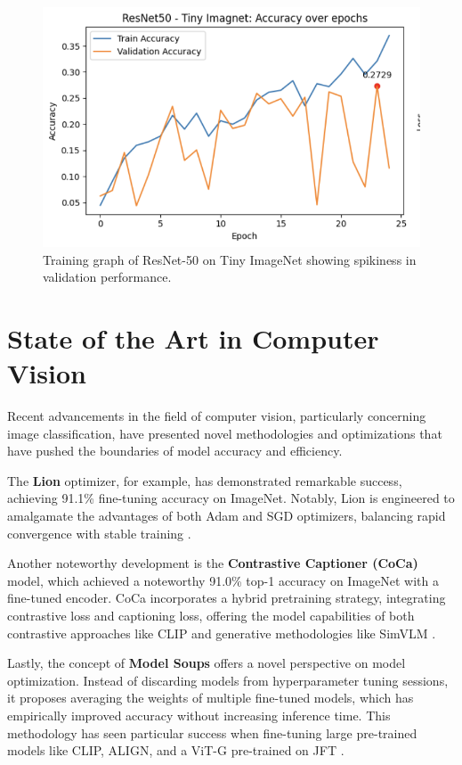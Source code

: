 \documentclass[letterpaper]{article}
\begin{document}
\begin{figure}
    \centering
    \includegraphics[width=0.8\linewidth]{resnet50_tiny_imagenet_training_graph.png}
    \caption{Training graph of ResNet-50 on Tiny ImageNet showing spikiness in validation performance.}
    \label{fig:spikygraph}
\end{figure}

\section{State of the Art in Computer Vision}

Recent advancements in the field of computer vision, particularly concerning image classification, have presented novel methodologies and optimizations that have pushed the boundaries of model accuracy and efficiency. 

The \textbf{Lion} optimizer, for example, has demonstrated remarkable success, achieving 91.1\% fine-tuning accuracy on ImageNet. Notably, Lion is engineered to amalgamate the advantages of both Adam and SGD optimizers, balancing rapid convergence with stable training \cite{chen2023symbolic}.

Another noteworthy development is the \textbf{Contrastive Captioner (CoCa)} model, which achieved a noteworthy 91.0\% top-1 accuracy on ImageNet with a fine-tuned encoder. CoCa incorporates a hybrid pretraining strategy, integrating contrastive loss and captioning loss, offering the model capabilities of both contrastive approaches like CLIP and generative methodologies like SimVLM \cite{yu2022coca}. 

Lastly, the concept of \textbf{Model Soups} offers a novel perspective on model optimization. Instead of discarding models from hyperparameter tuning sessions, it proposes averaging the weights of multiple fine-tuned models, which has empirically improved accuracy without increasing inference time. This methodology has seen particular success when fine-tuning large pre-trained models like CLIP, ALIGN, and a ViT-G pre-trained on JFT \cite{pmlr-v162-wortsman22a}.
\end{document}
